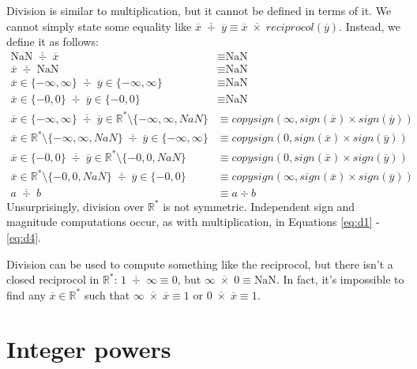 \documentclass[letterpaper,10pt]{article}
\newcommand{\NaN}{\text{NaN}}
\begin{document}
 Division is similar to multiplication, but it cannot be defined in terms of it. We cannot simply state some equality like $\overline{x} \;\overline{\div}\; \overline{y} \equiv \overline{x} \;\overline{\times}\; reciprocol(\overline{y})$. Instead, we define it as follows:
\begin{align}
 \NaN \;\overline{\div}\; \overline{x} &\equiv \NaN \\
 \overline{x} \;\overline{\div}\; \NaN &\equiv \NaN \\
 \overline{x} \in \{-\infty, \infty\} \;\overline{\div}\; \overline{y} \in \{-\infty, \infty\} &\equiv \NaN \\
 \overline{x} \in \{-0, 0\} \;\overline{\div}\; \overline{y} \in \{-0, 0\} &\equiv \NaN \\
 \overline{x} \in \{-\infty, \infty\} \;\overline{\div}\; \overline{y} \in \mathbb{R}^* \setminus \{-\infty, \infty, NaN\} &\equiv copysign(\infty, sign(\overline{x}) \times sign(\overline{y})) \label{eq:d1} \\
 \overline{x} \in \mathbb{R}^* \setminus \{-\infty, \infty, NaN\} \;\overline{\div}\; \overline{y} \in \{-\infty, \infty\} &\equiv copysign(0, sign(\overline{x}) \times sign(\overline{y})) \\
 \overline{x} \in \{-0, 0\} \;\overline{\div}\; \overline{y} \in \mathbb{R}^* \setminus \{-0, 0, NaN\} &\equiv copysign(0, sign(\overline{x}) \times sign(\overline{y})) \\
 \overline{x} \in \mathbb{R}^* \setminus \{-0, 0, NaN\} \;\overline{\div}\; \overline{y} \in \{-0, 0\} &\equiv copysign(\infty, sign(\overline{x}) \times sign(\overline{y})) \label{eq:d4} \\
 a \;\overline{\div}\; b &\equiv a \div b
\end{align}
 Unsurprisingly, division over $\mathbb{R}^*$ is not symmetric. Independent sign and magnitude computations occur, as with multiplication, in Equations \ref{eq:d1} - \ref{eq:d4}.
 
 Division can be used to compute something like the reciprocol, but there isn't a closed reciprocol in $\mathbb{R}^*$: $1 \;\overline{\div}\; \infty \equiv 0$, but $\infty \;\overline{\times}\; 0 \equiv \NaN$. In fact, it's impossible to find any $\overline{x} \in \mathbb{R}^*$ such that $\infty \;\overline{\times}\; \overline{x} \equiv 1$ or $0 \;\overline{\times}\; \overline{x} \equiv 1$.

\section{Integer powers}
\end{document}
